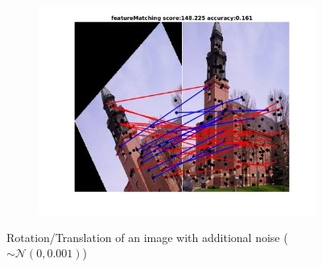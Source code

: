 \documentclass[
	fontsize=12pt,
	paper=a4,
	twoside=false,
	numbers=noenddot,
	plainheadsepline,
	toc=listof,
	toc=bibliography
]{scrartcl}
\begin{document}
\begin{figure}[h]
\begin{subfigure}[b]{0.33\textwidth}
		\includegraphics[scale=0.25]{"fig_ver2608/RealImages/ImgTrafo/anchor_descr/using_cpd_afftrafo/fi_5_featureMatching"} 
	\end{subfigure} 	
	\caption{Rotation/Translation of an image with additional noise ($\sim\mathcal{N}(0,0.001)$)}
\end{figure}

\FloatBarrier
\end{document}
